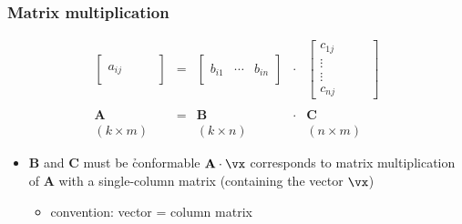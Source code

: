 \begin{frame}
  \frametitle{Matrix multiplication}

  \ungap
  \[
  \begin{array}{ccccc}
    \begin{bmatrix}
      & & & \\
      a_{ij} & & & \\
      & & &
    \end{bmatrix}
    & = &
    \begin{bmatrix}
      & &  \\
      b_{i1} & \cdots & b_{in} \\
      & &  
    \end{bmatrix}
    & \cdot &
    \begin{bmatrix}
      c_{1j} & & &\\
      \vdots & & & \\
      \vdots & & & \\
      c_{nj} & & & 
    \end{bmatrix} \\
    \\
    \mathbf{A} & = & \mathbf{B} & \cdot & \mathbf{C} \\
    (k\times m) & & (k\times n) & & (n\times m)
  \end{array}
  \]
  \begin{itemize}
  \item $\mathbf{B}$ and $\mathbf{C}$ must be \h{conformable}%
    \pause\gap 
    \itemhand $\mathbf{A}\cdot \vx$ corresponds to matrix
    multiplication of $\mathbf{A}$ with a single-column matrix (containing the
    vector $\vx$)
    \begin{itemize}
    \item convention: vector = column matrix
    \end{itemize}
  \end{itemize}
\end{frame}


